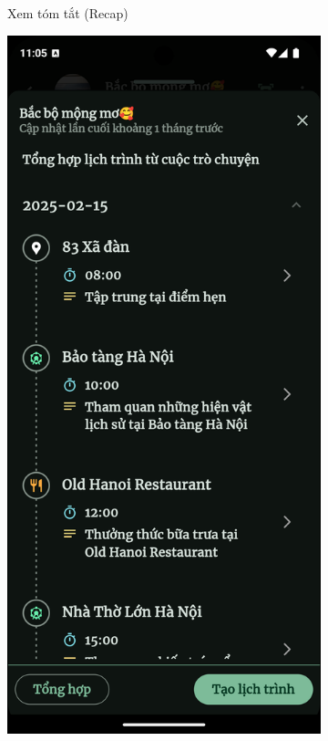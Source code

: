 \begin{figure}[H]
\begin{subfigure}{0.326\textwidth}
        \caption{Xem tóm tắt (Recap)}
        \label{fig:func_recap}
    \end{subfigure}
    \hfill
    \begin{subfigure}{0.326\textwidth}
        \includegraphics[width=1\linewidth]{figures/c4/system_func/summa.png}

\end{subfigure}
\end{figure}
